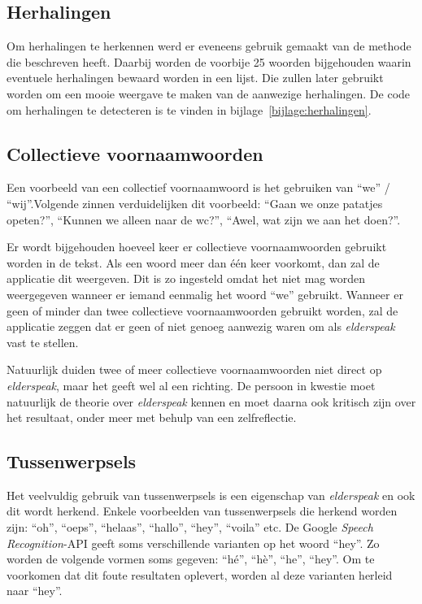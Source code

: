 \subsection{Herhalingen}
Om herhalingen te herkennen werd er eveneens gebruik gemaakt van de methode die \textcite{Standaert2021} beschreven heeft. Daarbij worden de voorbije 25 woorden bijgehouden waarin eventuele herhalingen bewaard worden in een lijst.
Die zullen later gebruikt worden om een mooie weergave te maken van de aanwezige herhalingen.
De code om herhalingen te detecteren is te vinden in bijlage~\ref{bijlage:herhalingen}.

\subsection{Collectieve voornaamwoorden}
Een voorbeeld van een collectief voornaamwoord is het gebruiken van ``we'' / ``wij''.Volgende zinnen verduidelijken dit voorbeeld: ``Gaan we onze patatjes opeten?'', ``Kunnen we alleen naar de wc?'', ``Awel, wat zijn we aan het doen?''.

Er wordt bijgehouden hoeveel keer er collectieve voornaamwoorden gebruikt worden in de tekst. Als een woord meer dan één keer voorkomt, dan zal de applicatie dit weergeven. Dit is zo ingesteld omdat het niet mag worden weergegeven wanneer er iemand eenmalig het woord ``we'' gebruikt.
Wanneer er geen of minder dan twee collectieve voornaamwoorden gebruikt worden, zal de applicatie zeggen dat er geen of niet genoeg aanwezig waren om als \textit{elderspeak} vast te stellen.

Natuurlijk duiden twee of meer collectieve voornaamwoorden niet direct op \textit{elderspeak}, maar het geeft wel al een richting. De persoon in kwestie moet natuurlijk de theorie over \textit{elderspeak} kennen en moet daarna ook kritisch zijn over het resultaat, onder meer met behulp van een zelfreflectie.

\subsection{Tussenwerpsels}
Het veelvuldig gebruik van tussenwerpsels is een eigenschap van \textit{elderspeak} en ook dit wordt herkend. Enkele voorbeelden van tussenwerpsels die herkend worden zijn: ``oh'', ``oeps'', ``helaas'', ``hallo'', ``hey'', ``voila'' etc. De Google \textit{Speech Recognition}-API geeft soms verschillende varianten op het woord ``hey''. Zo worden de volgende vormen soms gegeven: ``hé'', ``hè'', ``he'', ``hey''. Om te voorkomen dat dit foute resultaten oplevert, worden al deze varianten herleid naar ``hey''.

